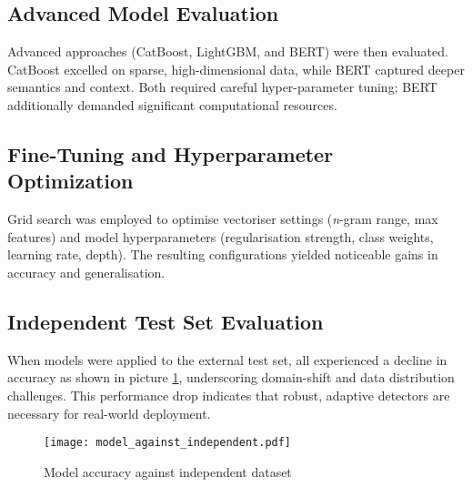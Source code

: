 \subsection{Advanced Model Evaluation}  %
Advanced approaches (CatBoost, LightGBM, and BERT) were
then evaluated. CatBoost excelled on sparse, high-dimensional data,
while BERT captured deeper semantics and context. Both required careful
hyper-parameter tuning; BERT additionally demanded significant
computational resources.

\subsection{Fine-Tuning and Hyperparameter Optimization}  %
Grid search was employed to optimise vectoriser settings
(\emph{n}-gram range, max features) and model hyperparameters
(regularisation strength, class weights, learning rate, depth). The
resulting configurations yielded noticeable gains in accuracy and
generalisation.

\subsection{Independent Test Set Evaluation}  %
When models were applied to the external test set, all experienced a
decline in accuracy as shown in picture \cref{fig:model_against_independent}, underscoring domain-shift and data distribution
challenges. This performance drop indicates that robust, adaptive
detectors are necessary for real-world deployment.

\begin{figure}[tb]
  \centering
  \texttt{[image: model\_against\_independent.pdf]}
  \vspace{-20pt}
  \caption{Model accuracy against independent dataset}
  \label{fig:model_against_independent}
\end{figure} 

